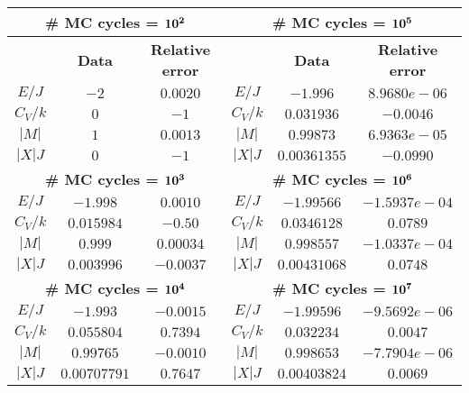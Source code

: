 \documentclass[12pt]{article}
\begin{document}
\begin{flushleft}
\begin{table}[!h]
\begin{center}
\begin{tabular}{| c | c | c || c | c | c |}
	\hline
   \multicolumn{3}{|c||}{	\textbf{\# MC cycles = $\bf 10^{2}$}} & \multicolumn{3}{|c|}{	\textbf{\# MC cycles = $\bf 10^{5}$}} \\
	\hline
	 & \textbf{Data} & \textbf{Relative error} & & \textbf{Data} & \textbf{Relative error}\\
	\hline	
	 $E/J$ & $-2$ & $0.0020$ & $E/J$ & $-1.996$ & $8.9680e-06$\\
	 $C_V/k$ & $0$ & $-1$ & 	 $C_V/k$ & $0.031936$ & $-0.0046$\\
	 $|M|$ & $1$ & $0.0013$ & 	 $|M|$ & $0.99873$ & $6.9363e-05$\\
	 $|X|J$ & $0$ & $-1$ & 	 $|X|J$ & $0.00361355$ & $-0.0990$\\

  \hline
  
  \hline
   \multicolumn{3}{|c||}{	\textbf{\# MC cycles = $\bf 10^{3}$}} & \multicolumn{3}{|c|}{	\textbf{\# MC cycles = $\bf 10^{6}$}} \\
	\hline	
	 $E/J$ & $-1.998$ & $0.0010$ & $E/J$ & $-1.99566$ & $-1.5937e-04$\\
	 $C_V/k$ & $0.015984$ & $-0.50$ & 	 $C_V/k$ & $0.0346128$ & $0.0789$\\
	 $|M|$ & $0.999$ & $0.00034$ & 	 $|M|$ & $0.998557$ & $-1.0337e-04$\\
	 $|X|J$ & $0.003996$ & $-0.0037$ & 	 $|X|J$ & $0.00431068$ & $0.0748$\\

  \hline
  
  \hline
   \multicolumn{3}{|c||}{	\textbf{\# MC cycles = $\bf 10^{4}$}} & \multicolumn{3}{|c|}{	\textbf{\# MC cycles = $\bf 10^{7}$}} \\
	\hline	
	 $E/J$ & $-1.993$ & $-0.0015$ & $E/J$ & $-1.99596$ & $-9.5692e-06$\\
	 $C_V/k$ & $0.055804$ & $0.7394$ & 	 $C_V/k$ & $0.032234$ & $0.0047$\\
	 $|M|$ & $0.99765$ & $-0.0010$ & 	 $|M|$ & $0.998653$ & $-7.7904e-06$\\
	 $|X|J$ & $0.00707791$ & $0.7647$ & 	 $|X|J$ & $0.00403824$ & $0.0069$\\


\end{tabular}
\end{center}
\end{table}
\end{flushleft}
\end{document}
